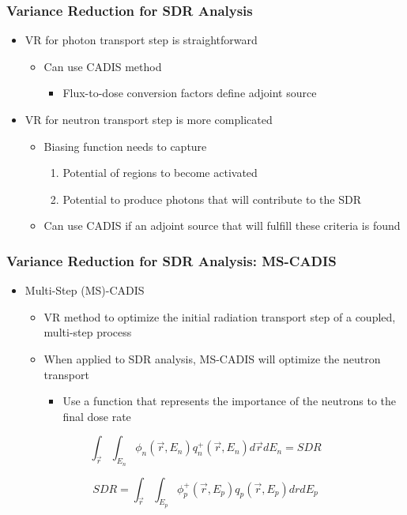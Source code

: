 \documentclass{beamer}
\begin{document}
\begin{frame}
\frametitle{Variance Reduction for SDR Analysis}
\begin{itemize}
\item{VR for photon transport step is straightforward}
  \begin{itemize}
  \item{Can use CADIS method}
    \begin{itemize}
    \item{Flux-to-dose conversion factors define adjoint source}
    \end{itemize}
  \end{itemize}
\item{VR for neutron transport step is more complicated}
    \begin{itemize}
    \item{Biasing function needs to capture}
      \begin{enumerate}
        \item{Potential of regions to become activated}
        \item{Potential to produce photons that will contribute to the SDR}
      \end{enumerate}
    \item{Can use CADIS if an adjoint source that will fulfill these criteria is
	    found}
    \end{itemize}
\end{itemize}
\end{frame}


\begin{frame}
\frametitle{Variance Reduction for SDR Analysis: MS-CADIS}
\begin{itemize}
\item{Multi-Step (MS)-CADIS}
  \begin{itemize}
  \item {VR method to optimize the initial radiation transport step of a coupled, multi-step process}
  \item{When applied to SDR analysis, MS-CADIS will optimize the neutron transport}
    \begin{itemize}
    \item{Use a function that represents the   importance of the neutrons to
	    the final dose rate}
    \end{itemize}
  \end{itemize}
\end{itemize}
 \centering
	\begin{equation}
	\int_{\overrightarrow{r}} \int_{E_n} \phi_n(\overrightarrow{r}, E_n)
	q_n^+(\overrightarrow{r}, E_n) d\overrightarrow{r} dE_n = SDR
	\end{equation}

 \centering
	\begin{equation}
	SDR = \int_{\overrightarrow{r}} \int_{E_p} 
		\phi_p^+(\overrightarrow{r}, E_p)  q_p(\overrightarrow{r}, E_p)
		dr dE_p 
	\end{equation}
\end{frame}
\end{document}

